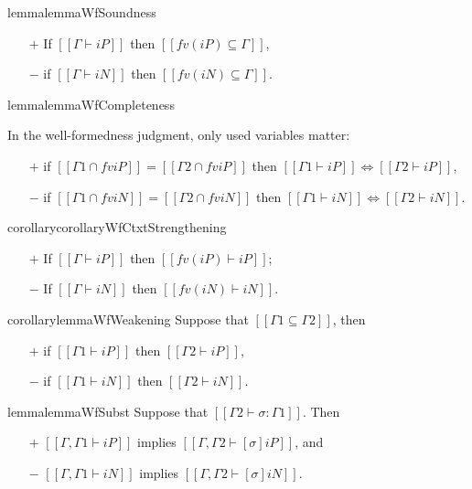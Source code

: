 \begin{restatable}{lemma}{lemmaWfSoundness}
    \label{lemma:wf-soundness}
        \hfill
        \begin{itemize}
            \item[$+$] If $[[Γ ⊢ iP]]$ then $[[fv(iP) ⊆ Γ]]$,
            \item[$-$] if $[[Γ ⊢ iN]]$ then $[[fv(iN) ⊆ Γ]]$.
        \end{itemize}
\end{restatable}

\begin{restatable}{lemma}{lemmaWfCompleteness}
    \label{lemma:wf-ctxt-equiv}

    In the well-formedness judgment, only used variables matter:
    \begin{itemize}
        \item[$+$] if $[[Γ1 ∩ fv iP]] = [[Γ2 ∩ fv iP]]$ then
        $[[Γ1 ⊢ iP]] \iff [[Γ2 ⊢ iP]]$,
        \item[$-$] if $[[Γ1 ∩ fv iN]] = [[Γ2 ∩ fv iN]]$ then
        $[[Γ1 ⊢ iN]] \iff [[Γ2 ⊢ iN]]$.
    \end{itemize}
\end{restatable}

\begin{restatable}{corollary}{corollaryWfCtxtStrengthening}
    \label{corollary:wf-ctxt-strengthening}
    \hfill
    
    \begin{itemize}
      \item [$+$] If $[[Γ ⊢ iP]]$ then $[[fv(iP) ⊢ iP]]$;
      \item [$-$] If $[[Γ ⊢ iN]]$ then $[[fv(iN) ⊢ iN]]$.
    \end{itemize}
\end{restatable}


 \begin{restatable}{corollary}{lemmaWfWeakening}
    \label{lemma:wf-weakening}
    Suppose that $[[Γ1 ⊆ Γ2]]$, then
    \begin{itemize}
      \item[$+$] if $[[Γ1 ⊢ iP]]$ then $[[Γ2 ⊢ iP]]$,
      \item[$-$] if $[[Γ1 ⊢ iN]]$ then $[[Γ2 ⊢ iN]]$.
    \end{itemize}
\end{restatable}

\begin{restatable}{lemma}{lemmaWfSubst}
    \label{lemma:wf-subst}
    Suppose that $[[Γ2 ⊢ σ : Γ1]]$. Then
    \begin{itemize}
    \item[$+$] $[[Γ, Γ1 ⊢ iP]]$ implies $[[Γ, Γ2 ⊢ [σ]iP]]$, and
    \item[$-$] $[[Γ, Γ1 ⊢ iN]]$ implies $[[Γ, Γ2 ⊢ [σ]iN]]$.
    \end{itemize}
\end{restatable}
